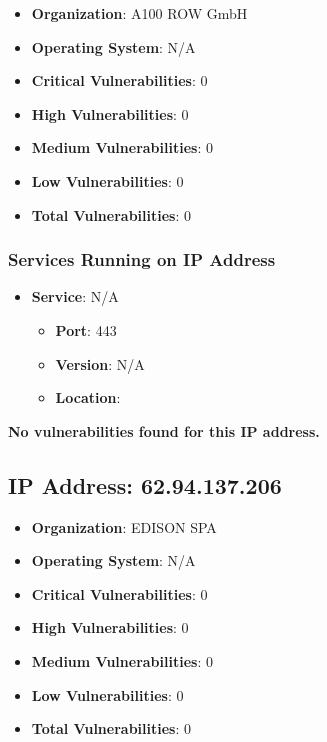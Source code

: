 \documentclass{article}
\begin{document}
\begin{itemize}
    \item \textbf{Organization}: A100 ROW GmbH
    \item \textbf{Operating System}:  N/A 
    \item \textbf{Critical Vulnerabilities}: 0
    \item \textbf{High Vulnerabilities}: 0
    \item \textbf{Medium Vulnerabilities}: 0
    \item \textbf{Low Vulnerabilities}: 0
    \item \textbf{Total Vulnerabilities}: 0
\end{itemize}

\subsubsection*{Services Running on IP Address}

\begin{itemize}
    
        \item \textbf{Service}: N/A
        \begin{itemize}
            \item \textbf{Port}: 443
            \item \textbf{Version}:  N/A 
            \item \textbf{Location}: \href{  }{  }
        \end{itemize}
    
\end{itemize}


\textbf{No vulnerabilities found for this IP address.}




\clearpage



\subsection{IP Address: 62.94.137.206}

\begin{itemize}
    \item \textbf{Organization}: EDISON SPA
    \item \textbf{Operating System}:  N/A 
    \item \textbf{Critical Vulnerabilities}: 0
    \item \textbf{High Vulnerabilities}: 0
    \item \textbf{Medium Vulnerabilities}: 0
    \item \textbf{Low Vulnerabilities}: 0
    \item \textbf{Total Vulnerabilities}: 0
\end{itemize}
\end{document}
